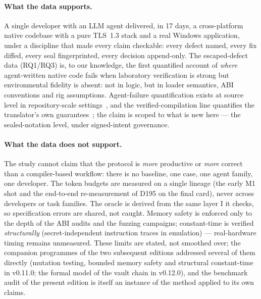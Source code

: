 \documentclass[11pt,a4paper]{article}
\begin{document}
\paragraph{What the data supports.} A single developer with an LLM agent
delivered, in 17 days, a cross-platform native codebase with a pure
TLS~1.3 stack and a real Windows application, under a discipline that
made every claim checkable: every defect named, every fix diffed, every
seal fingerprinted, every decision append-only. The escaped-defect data
(RQ1/RQ3) is, to our knowledge, the first quantified account of
\emph{where} agent-written native code fails when laboratory verification
is strong but environmental fidelity is absent: not in logic, but in
loader semantics, ABI conventions and rig assumptions. Agent-failure
quantification exists at source level in repository-scale
settings~\cite{yang2024sweagent}, and the verified-compilation line
quantifies the translator's own guarantees~\cite{leroycompcert}; the
claim is scoped to what is new here --- the sealed-notation level, under
signed-intent governance.

\paragraph{What the data does not support.} The study cannot claim that
the protocol is \emph{more} productive or \emph{more} correct than a
compiler-based workflow: there is no baseline, one case, one agent
family, one developer. The token budgets are measured on a single
lineage (the early M1 shot and the end-to-end re-measurement of D195
on the final card), never across developers or task families. The
oracle is derived from the same layer I it checks, so
specification errors are shared, not caught. Memory safety is enforced
only to the depth of the ABI audits and the fuzzing campaigns;
constant-time is verified \emph{structurally} (secret-independent
instruction traces in emulation) --- real-hardware timing remains
unmeasured. These limits are stated, not smoothed over; the companion
programmes of the two subsequent editions addressed several of them
directly (mutation testing, bounded memory safety and structural
constant-time in v0.11.0; the formal model of the vault chain in
v0.12.0), and the benchmark audit of the present edition is itself an
instance of the method applied to its own claims.
\end{document}
